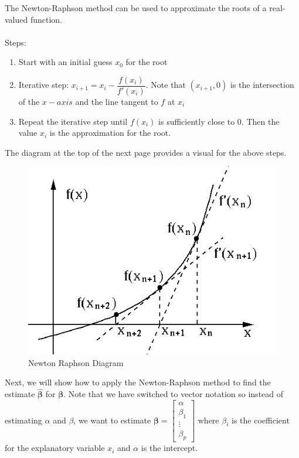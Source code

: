 \documentclass[12pt,timesnewroman,letterpaper]{article}
\begin{document}
The Newton-Raphson method can be used to approximate the roots of a real-valued function. \\\\
Steps:
\begin{enumerate}
    \item Start with an initial guess $x_0$ for the root
    \item Iterative step: $x_{i+1} = x_i - \dfrac{f(x_i)}{f'(x_i)}$. Note that $(x_{i+1}, 0)$ is the intersection of the $x-axis$ and the line tangent to $f$ at $x_i$
    \item Repeat the iterative step until $f(x_i)$ is sufficiently close to $0$. Then the value $x_i$ is the approximation for the root.
\end{enumerate}

\noindent The diagram at the top of the next page provides a visual for the above steps.\\

\begin{figure}[hbtp]
        \centering
        \includegraphics[width=4.5in]{NewtonRaphson.png}
        \caption{Newton Raphson Diagram}
        \label{Newton Raphson}
    \end{figure}

\noindent Next, we will show how to apply the Newton-Raphson method to find the estimate  $\boldsymbol{\hat{\beta}}$ for $\boldsymbol{\beta}$. Note that we have switched to vector notation so instead of estimating $\alpha$ and $\beta$, we want to estimate $\boldsymbol{\beta} = 
\begin{bmatrix} 
    \alpha \\
    \beta_1 \\
    \vdots \\
    \beta_p
\end{bmatrix}$ where $\beta_i$ is the coefficient for the explanatory variable $x_i$ and $\alpha$ is the intercept. \\
\end{document}
